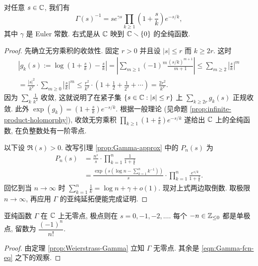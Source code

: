 \begin{theorem}[K.\ Weierstrass]\label{prop:Weierstrass-Gamma}
	对任意 $s \in \mathbb{C}$, 我们有
	\[ \Gamma(s)^{-1} = s e^{\gamma s} \prod_{k \geq 1} \left( 1 + \frac{s}{k} \right) e^{-s/k}, \]
	其中 $\gamma$ 是 Euler 常数.	右式是从 $\mathbb{C}$ 映到 $\mathbb{C} \smallsetminus \{0\}$ 的全纯函数.
\end{theorem}
\begin{proof}
	先确立无穷乘积的收敛性. 固定 $r > 0$ 并且设 $|s| \leq r$ 而 $k \geq 2r$. 这时
	\begin{multline*}
		\left| g_k(s) := \log\left( 1 + \frac{s}{k} \right) - \frac{s}{k} \right| = \left| \sum_{m \geq 1} (-1)^m \frac{(s/k)^{m+1}}{m+1} \right| \leq \sum_{m \geq 2} \left| \frac{s}{k} \right|^m \\
		= \frac{|s|^2}{k^2} \cdot \sum_{m \geq 0} \left|\frac{s}{k} \right|^m \leq \frac{r^2}{k^2} \cdot \left( 1 + \frac{1}{2} + \frac{1}{2^2} + \cdots \right) = \frac{2r^2}{k^2}.
	\end{multline*}
	因为 $\sum_k \frac{1}{k^2}$ 收敛, 这就说明了在紧子集 $\left\{ s \in \mathbb{C} : |s| \leq r \right\}$ 上 $\sum_{k \geq 2r} g_k(s)$ 正规收敛. 此外 $\exp(g_k) = \left( 1 + \frac{s}{k} \right) e^{-s/k}$. 根据一般理论 (见命题 \ref{prop:infinite-product-holomorphy}), 收敛无穷乘积 $\prod_{k \geq 1} \left(1 + \frac{s}{k} \right) e^{-s/k}$ 遂给出 $\mathbb{C}$ 上的全纯函数, 在负整数处有一阶零点.
	
	以下设 $\Re(s) > 0$. 改写引理 \ref{prop:Gamma-approx} 中的 $P_n(s)$ 为
	\begin{align*}
		P_n(s) & = \frac{n^s}{s} \cdot \prod_{k=1}^n \frac{1}{1 + \frac{s}{k}} \\
		& = \frac{\exp\left( s(\log n - \sum_{k=1}^n k^{-1} ) \right)}{s} \cdot \prod_{k=1}^n \frac{e^{s/k}}{1 + \frac{s}{k}}.
	\end{align*}
	回忆到当 $n \to \infty$ 时 $\sum_{k=1}^n \frac{1}{k} = \log n + \gamma + o(1)$. 现对上式两边取倒数. 取极限 $n \to \infty$, 再应用 $\Gamma$ 的亚纯延拓便能完成证明.
\end{proof}

\begin{corollary}\label{prop:Gamma-poles}
	亚纯函数 $\Gamma$ 在 $\mathbb{C}$ 上无零点, 极点则在 $s = 0,-1,-2, \ldots$. 每个 $-n \in \mathbb{Z}_{\leq 0}$ 都是单极点, 留数为 $\dfrac{(-1)^n}{n!}$.
\end{corollary}
\begin{proof}
	由定理 \ref{prop:Weierstrass-Gamma} 立知 $\Gamma$ 无零点. 其余是 \eqref{eqn:Gamma-fcn-eq} 之下的观察.
\end{proof}

